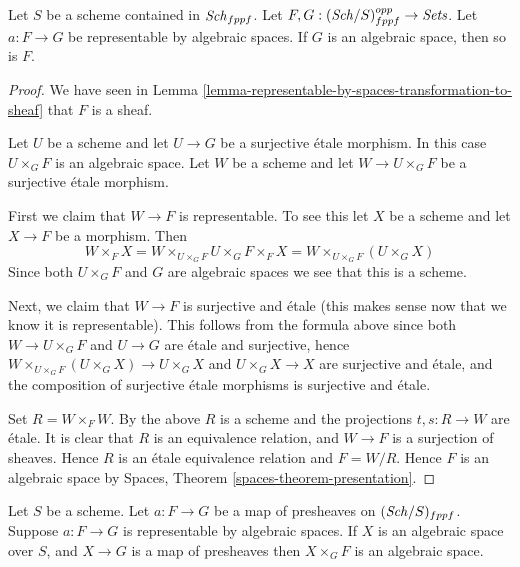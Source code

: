\begin{lemma}
\label{lemma-representable-by-spaces-over-space}
Let $S$ be a scheme contained in $\mathit{Sch}_{fppf}$.
Let $F, G : (\mathit{Sch}/S)_{fppf}^{opp} \to \textit{Sets}$.
Let $a : F \to G$ be representable by algebraic spaces.
If $G$ is an algebraic space, then so is $F$.
\end{lemma}

\begin{proof}
We have seen in
Lemma \ref{lemma-representable-by-spaces-transformation-to-sheaf}
that $F$ is a sheaf.

\medskip\noindent
Let $U$ be a scheme and let $U \to G$ be a surjective \'etale morphism.
In this case $U \times_G F$ is an algebraic space. Let $W$ be a scheme
and let $W \to U \times_G F$ be a surjective \'etale morphism.

\medskip\noindent
First we claim that $W \to F$ is representable.
To see this let $X$ be a scheme and let $X \to F$ be a morphism.
Then
$$
W \times_F X = W \times_{U \times_G F} U \times_G F \times_F X
= W \times_{U \times_G F} (U \times_G X)
$$
Since both $U \times_G F$ and $G$ are algebraic spaces we see that
this is a scheme.

\medskip\noindent
Next, we claim that $W \to F$ is surjective and \'etale (this makes
sense now that we know it is representable). This follows from the
formula above since both $W \to U \times_G F$ and $U \to G$
are \'etale and surjective, hence
$W \times_{U \times_G F} (U \times_G X) \to U \times_G X$ and
$U \times_G X \to X$ are surjective and \'etale, and the composition of
surjective \'etale morphisms is surjective and \'etale.

\medskip\noindent
Set $R = W \times_F W$. By the above $R$ is a scheme and
the projections $t, s : R \to W$
are \'etale. It is clear that $R$ is an equivalence relation, and
$W \to F$ is a surjection of sheaves. Hence $R$ is an \'etale equivalence
relation and $F = W/R$. Hence $F$ is an algebraic space by
Spaces,
Theorem \ref{spaces-theorem-presentation}.
\end{proof}

\begin{lemma}
\label{lemma-representable-by-spaces}
Let $S$ be a scheme.
Let $a : F \to G$ be a map of presheaves on $(\mathit{Sch}/S)_{fppf}$.
Suppose $a : F \to G$ is representable by algebraic spaces.
If $X$ is an algebraic space over $S$, and $X \to G$ is a map of presheaves
then $X \times_G F$ is an algebraic space.
\end{lemma}

